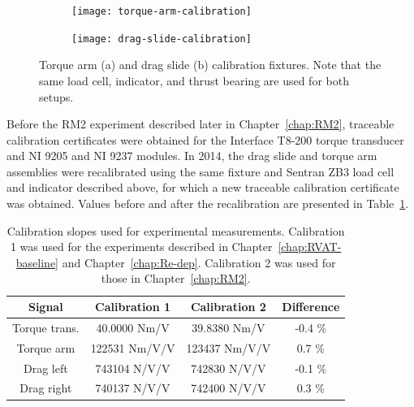\begin{figure}
    \centering
    \begin{subfigure}{0.9\textwidth}
        \texttt{[image: torque-arm-calibration]} \caption{}
    \end{subfigure}

    \begin{subfigure}{0.9\textwidth}
        \texttt{[image: drag-slide-calibration]}
        \caption{}
    \end{subfigure}

    \caption{Torque arm (a) and drag slide (b) calibration fixtures. Note that
        the same load cell, indicator, and thrust bearing are used for both setups.}

    \label{fig:calibration-fixtures}
\end{figure}

Before the RM2 experiment described later in Chapter~\ref{chap:RM2}, traceable
calibration certificates were obtained for the Interface T8-200 torque
transducer and NI 9205 and NI 9237 modules. In 2014, the drag slide and torque
arm assemblies were recalibrated using the same fixture and Sentran ZB3 load
cell and indicator described above, for which a new traceable calibration
certificate was obtained. Values before and after the recalibration are
presented in Table~\ref{tab:calibrations}.


\begin{table}
    \centering
\begin{tabular}{c|c|c|c}
    Signal & Calibration 1 & Calibration 2 & Difference \\
    \hline
    Torque trans. & 40.0000 Nm/V & 39.8380 Nm/V & -0.4 \% \\
    Torque arm & 122531 Nm/V/V & 123437 Nm/V/V & 0.7 \% \\
    Drag left & 743104 N/V/V & 742830 N/V/V & -0.1 \% \\
    Drag right & 740137 N/V/V & 742400 N/V/V & 0.3 \% \\
\end{tabular}
    \caption{Calibration slopes used for experimental measurements. Calibration
        1 was used for the experiments described in Chapter~\ref{chap:RVAT-baseline}
        and Chapter~\ref{chap:Re-dep}. Calibration 2 was used for those in
        Chapter~\ref{chap:RM2}.}

    \label{tab:calibrations}
\end{table}


